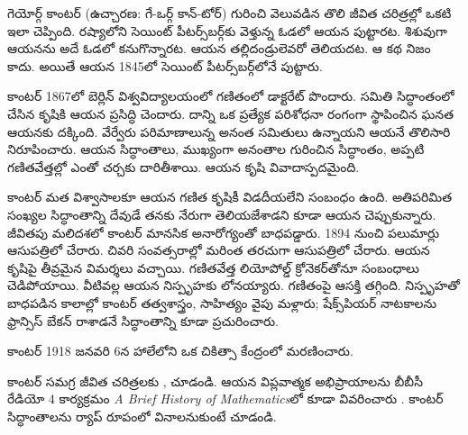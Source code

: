 \documentclass[../../../include/open-logic-section]{subfiles}
\begin{document}



గెయోర్గ్ కాంటర్ (ఉచ్చారణ: గే-ఒర్గ్ కాన్-టోర్) గురించి వెలువడిన
తొలి జీవిత చరిత్రల్లో ఒకటి ఇలా చెప్పింది. రష్యాలోని సెయింట్
పీటర్స్‌బర్గ్‌కు వెళ్తున్న ఓడలో ఆయన పుట్టారట. శిశువుగా ఆయనను
అదే ఓడలో కనుగొన్నారట. ఆయన తల్లిదండ్రులెవరో తెలియదట.
ఆ కథ నిజం కాదు. అయితే ఆయన 1845లో సెయింట్
పీటర్స్‌బర్గ్‌లోనే పుట్టారు.

కాంటర్ 1867లో బెర్లిన్ విశ్వవిద్యాలయంలో గణితంలో డాక్టరేట్ పొందారు. సమితి సిద్ధాంతంలో చేసిన కృషికి ఆయన ప్రసిద్ధి చెందారు. దాన్ని ఒక ప్రత్యేక పరిశోధనా రంగంగా స్థాపించిన ఘనత ఆయనకు దక్కింది. వేర్వేరు పరిమాణాలున్న అనంత సమితులు ఉన్నాయని ఆయనే తొలిసారి నిరూపించారు. ఆయన సిద్ధాంతాలు, ముఖ్యంగా అనంతాల గురించిన సిద్ధాంతం, అప్పటి గణితవేత్తల్లో ఎంతో చర్చకు దారితీశాయి. ఆయన కృషి వివాదాస్పదమైంది.

కాంటర్ మత విశ్వాసాలకూ ఆయన గణిత కృషికీ విడదీయలేని సంబంధం ఉంది.
అతిపరిమిత సంఖ్యల సిద్ధాంతాన్ని దేవుడే తనకు నేరుగా
తెలియజేశాడని కూడా ఆయన చెప్పుకున్నారు. జీవితపు మలిదశలో కాంటర్ మానసిక అనారోగ్యంతో
బాధపడ్డారు. 1894 నుంచి పలుమార్లు ఆసుపత్రిలో చేరారు.
చివరి సంవత్సరాల్లో మరింత తరచుగా ఆసుపత్రిలో చేరారు. ఆయన కృషిపై తీవ్రమైన విమర్శలు వచ్చాయి. గణితవేత్త లియోపోల్డ్
క్రోనెకర్‌తోనూ సంబంధాలు చెడిపోయాయి. వీటివల్ల ఆయన నిస్పృహకు
లోనయ్యారు. గణితంపై ఆసక్తి తగ్గింది. నిస్పృహతో బాధపడిన కాలాల్లో కాంటర్ తత్వశాస్త్రం, సాహిత్యం వైపు మళ్లారు; షేక్స్‌పియర్ నాటకాలను ఫ్రాన్సిస్ బేకన్ రాశాడనే సిద్ధాంతాన్ని కూడా ప్రచురించారు.

కాంటర్ 1918 జనవరి 6న హాలేలోని ఒక చికిత్సా కేంద్రంలో మరణించారు.

\begin{reading}
కాంటర్ సమగ్ర జీవిత చరిత్రలకు \citet{Dauben1990}, \citet{Grattan-Guinness1971} చూడండి. ఆయన విప్లవాత్మక అభిప్రాయాలను బీబీసీ రేడియో 4 కార్యక్రమం \emph{A Brief History of
  Mathematics}లో కూడా వివరించారు \citep{Sautoy2014}. కాంటర్ సిద్ధాంతాలను ర్యాప్ రూపంలో వినాలనుకుంటే \citet{Rose2012} చూడండి.
\end{reading}
\end{document}

